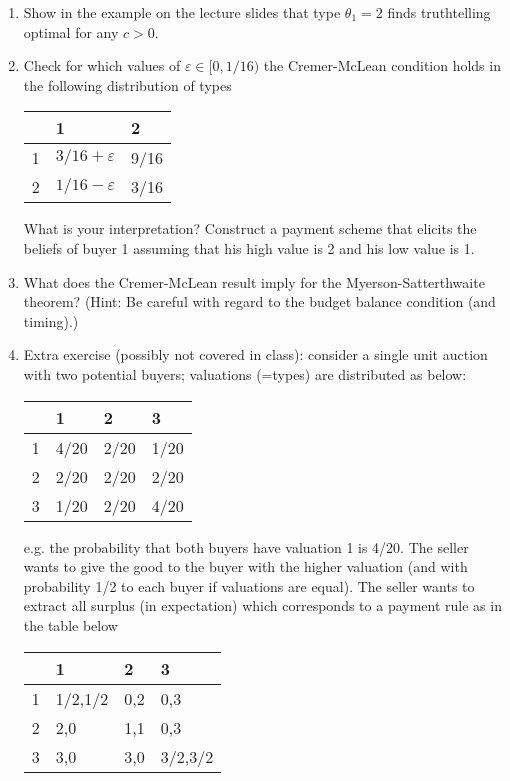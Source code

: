 \documentclass[a4paper,12pt]{article}
\begin{document}
\begin{enumerate}
\item Show in the example on the lecture slides that type $\theta_1=2$ finds truthtelling optimal for any $c> 0$.
\item Check for which values of $\varepsilon\in[0,1/16)$ the Cremer-McLean condition holds in the following distribution of types
  \begin{center}
\begin{tabular}{r|ll}
 & 1 & 2 \\
\hline
1 & $3/16+\varepsilon $ & 9/16 \\
2 & $1/16-\varepsilon $ & 3/16
\end{tabular}
\end{center}
What is your interpretation? Construct a payment scheme that elicits the beliefs of buyer 1 assuming that his high value is 2 and his low value is 1. 
\item What does the Cremer-McLean result imply for the Myerson-Satterthwaite theorem? (Hint: Be careful with regard to the budget balance condition (and timing).)
\item Extra exercise (possibly not covered in class): consider a single unit auction with two potential buyers; valuations (=types) are distributed as below:
\begin{center}
\begin{tabular}{r|lll}
 & 1 & 2 & 3\\
\hline
1 & 4/20 & 2/20 & 1/20\\
2 & 2/20 & 2/20 & 2/20\\
3 & 1/20 & 2/20 & 4/20\\
\end{tabular}
\end{center}
e.g. the probability that both buyers have valuation 1 is 4/20. The seller wants to give the good to the buyer with the higher valuation (and with probability 1/2 to each buyer if valuations are equal). The seller wants to extract all surplus (in expectation) which corresponds to a payment rule as in the table below
\begin{center}
\begin{tabular}{r|lll}
 & 1 & 2 & 3\\
\hline
1 & 1/2,1/2 & 0,2 & 0,3\\
2 & 2,0 & 1,1 & 0,3\\
3 & 3,0 & 3,0 & 3/2,3/2\\
\end{tabular}
\end{center}

\end{enumerate}
\end{document}
